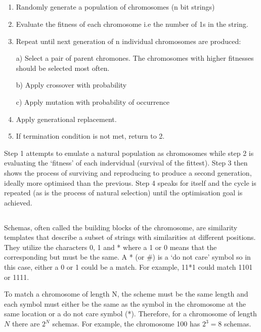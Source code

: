 \documentclass[a4paper]{report}
\begin{document}
\subsection{}
\begin{enumerate}
    \item Randomly generate a population of chromosomes (n bit strings)
    \item Evaluate the fitness of each chromosome i.e the number of 1s in the string.
    \item Repeat until next generation of n individual chromosomes are produced:

          a) Select a pair of parent chromones. The chromosomes with higher fitnesses
          should be selected most often.

          b) Apply crossover with probability

          c) Apply mutation with probability of occurrence
    \item Apply generational replacement.
    \item If termination condition is not met, return to 2.
\end{enumerate}

Step 1 attempts to emulate a natural population as chromosomes while step 2 is evaluating the `fitness' of each indervidual (survival of the fittest). Step 3 then shows the process of surviving and reproducing to produce a second generation, ideally more optimised than the previous. Step 4 speaks for itself and the cycle is repeated (as is the process of natural selection) until the optimisation goal is achieved.

\subsection{}
Schemas, often called the building blocks of the chromosome, are similarity templates that describe a subset of strings with similarities at different positions. They utilize the characters 0, 1 and * where a 1 or 0 means that the corresponding but must be the same. A * (or \#) is a `do not care’ symbol so in this case, either a 0 or 1 could be a match. For example, 11*1 could match 1101 or 1111.

To match a chromosome of length N, the scheme must be the same length and each symbol must either be the same as the symbol in the chromosome at the same location or a do not care symbol (*). Therefore, for a chromosome of length \(N\) there are \(2^N\) schemas. For example, the chromosome 100 has \(2^3 = 8\) schemas.
\end{document}
